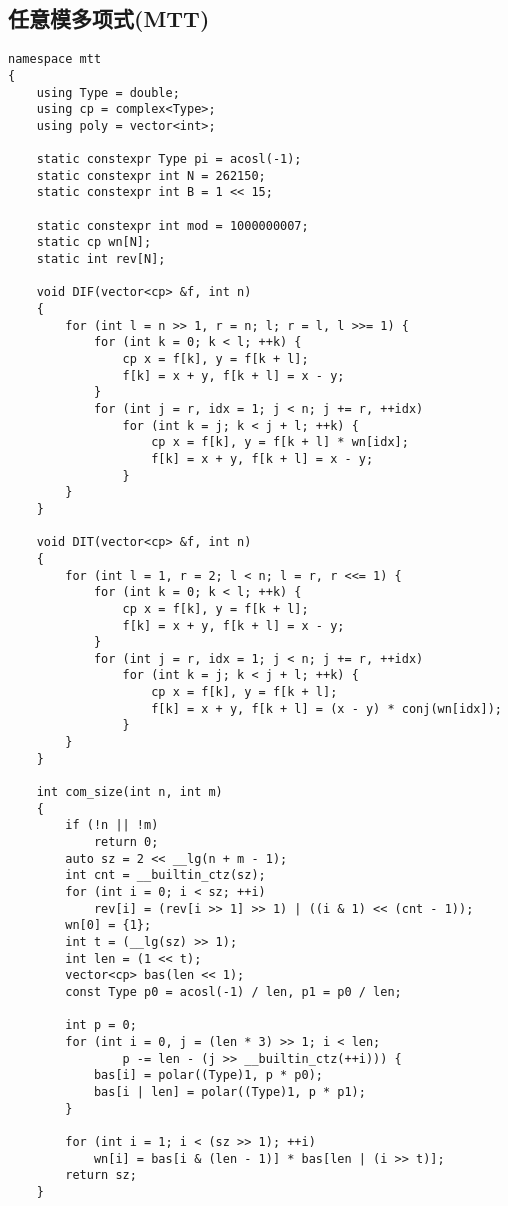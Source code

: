 \documentclass[twocolumn,a4]{article}
\begin{document}
\subsection{任意模多项式(MTT)}
\begin{lstlisting}
namespace mtt
{
    using Type = double;
    using cp = complex<Type>;
    using poly = vector<int>;

    static constexpr Type pi = acosl(-1);
    static constexpr int N = 262150;
    static constexpr int B = 1 << 15;

    static constexpr int mod = 1000000007;
    static cp wn[N];
    static int rev[N];

    void DIF(vector<cp> &f, int n)
    {
        for (int l = n >> 1, r = n; l; r = l, l >>= 1) {
            for (int k = 0; k < l; ++k) {
                cp x = f[k], y = f[k + l];
                f[k] = x + y, f[k + l] = x - y;
            }
            for (int j = r, idx = 1; j < n; j += r, ++idx)
                for (int k = j; k < j + l; ++k) {
                    cp x = f[k], y = f[k + l] * wn[idx];
                    f[k] = x + y, f[k + l] = x - y;
                }
        }
    }

    void DIT(vector<cp> &f, int n)
    {
        for (int l = 1, r = 2; l < n; l = r, r <<= 1) {
            for (int k = 0; k < l; ++k) {
                cp x = f[k], y = f[k + l];
                f[k] = x + y, f[k + l] = x - y;
            }
            for (int j = r, idx = 1; j < n; j += r, ++idx)
                for (int k = j; k < j + l; ++k) {
                    cp x = f[k], y = f[k + l];
                    f[k] = x + y, f[k + l] = (x - y) * conj(wn[idx]);
                }
        }
    }

    int com_size(int n, int m)
    {
        if (!n || !m)
            return 0;
        auto sz = 2 << __lg(n + m - 1);
        int cnt = __builtin_ctz(sz);
        for (int i = 0; i < sz; ++i)
            rev[i] = (rev[i >> 1] >> 1) | ((i & 1) << (cnt - 1));
        wn[0] = {1};
        int t = (__lg(sz) >> 1);
        int len = (1 << t);
        vector<cp> bas(len << 1);
        const Type p0 = acosl(-1) / len, p1 = p0 / len;

        int p = 0;
        for (int i = 0, j = (len * 3) >> 1; i < len;
                p -= len - (j >> __builtin_ctz(++i))) {
            bas[i] = polar((Type)1, p * p0);
            bas[i | len] = polar((Type)1, p * p1);
        }

        for (int i = 1; i < (sz >> 1); ++i)
            wn[i] = bas[i & (len - 1)] * bas[len | (i >> t)];
        return sz;
    }


\end{lstlisting}
\end{document}
